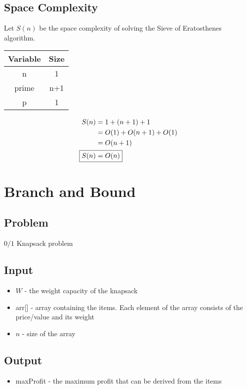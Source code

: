 \documentclass[12pt]{article}%
\begin{document}
  \subsection{Space Complexity}
    Let $S(n)$ be the space complexity of solving the Sieve of Eratosthenes algorithm.
    \begin{table}[]
      \centering
      \begin{tabular}{|c|c|}
        \hline
        \textbf{Variable} & \textbf{Size} \\ \hline
        n                 & 1             \\ \hline
        prime             & n+1           \\ \hline
        p                 & 1             \\ \hline
      \end{tabular}
    \end{table}
    \begin{align*}
      S(n) &= 1 + (n + 1) + 1 \\  
      &= O(1) + O(n + 1) + O(1) \\
      &= O(n + 1) \\
      \Aboxed{S(n) &= O(n)}
    \end{align*}

\newpage

\section{Branch and Bound}
  \subsection{Problem}
    $0/1$ Knapsack problem
  \subsection{Input}
      \begin{itemize}
        \item $W$ - the weight capacity of the knapsack
        \item arr[] - array containing the items. Each element of the array consists of the price/value and its weight 
        \item $n$ - size of the array
      \end{itemize}
  \subsection{Output}
      \begin{itemize}
        \item maxProfit - the maximum profit that can be derived from the items 
      \end{itemize}
\end{document}
